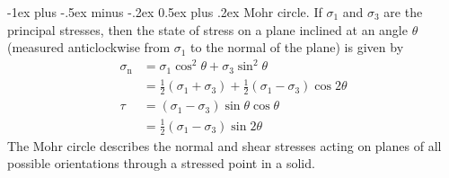 \documentclass[10pt,landscape,a4paper]{article}
\makeatletter
\renewcommand{\section}{\@startsection{section}{1}{0mm}%
	{-1ex plus -.5ex minus -.2ex}%
	{0.5ex plus .2ex}%
	{\normalfont\large\bfseries}}
\makeatother
\begin{document}
\begin{multicols}{3}
	\section{Mohr circle.}
	If $ \sigma_1 $ and $ \sigma_3 $ are the principal stresses, then the state of stress on a plane inclined at an angle $ \theta $ (measured anticlockwise from $ \sigma_1 $ to the normal of the plane) is given by
	\begin{align*}
		\sigma_\text{n} & =\sigma_1\cos^2\theta+\sigma_3\sin^2\theta                                \\
		                & =\frac{1}{2}(\sigma_1+\sigma_3)+\frac{1}{2}(\sigma_1-\sigma_3)\cos2\theta \\
		\tau            & =(\sigma_1-\sigma_3)\sin\theta\cos\theta                                  \\
		                & =\frac{1}{2}(\sigma_1-\sigma_3)\sin2\theta
	\end{align*}
	The Mohr circle describes the normal and shear stresses acting on planes of all possible orientations through a stressed point in a solid.
	

\end{multicols}
\end{document}
